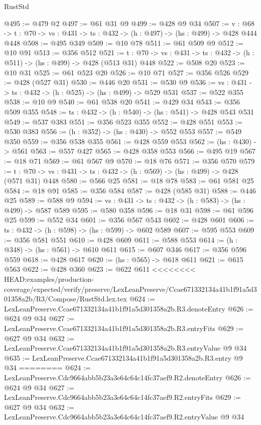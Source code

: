 \begin{lexlean}{RustStd}
\begin{coremodule}
{\begin{coremodule}
@495 := @479 @2
@497 := @61 @31 @9
@499 := @428 @9 @34
@507 := {v : @68} ->
  {t : @70} -> {vs : @431} -> {ts : @432} -> (h : @497) -> (hs : @499) -> @428 @444 @448
@508 := @495 @349
@509 := @10 @78
@511 := @61 @509 @9
@512 := @10 @91
@513 := @356 @512
@521 := {t : @70} -> {vs : @431} -> {ts : @432} -> (h : @511) -> (hs : @499) -> @428 (@513 @31) @448
@522 := @508 @20
@523 := @10 @31
@525 := @61 @523 @20
@526 := @10 @71
@527 := @356 @526
@529 := @428 (@527 @31)
@530 := @446 @20
@531 := @530 @9
@536 := {vs : @431} -> {ts : @432} -> (h : @525) -> (hs : @499) -> @529 @531
@537 := @522 @355
@538 := @10 @9
@540 := @61 @538 @20
@541 := @429 @34
@543 := @356 @509 @355
@548 := {ts : @432} -> (h : @540) -> (hs : @541) -> @428 @543 @531
@549 := @537 @383
@551 := @356 @523 @355
@552 := @428 @551
@553 := @530 @383
@556 := (h : @352) -> (hs : @430) -> @552 @553
@557 := @549 @350
@559 := @356 @538 @355
@561 := @428 @559 @553
@562 := (hs : @430) -> @561
@563 := @557 @427
@565 := @428 @358 @553
@566 := @495 @19
@567 := @18 @71
@569 := @61 @567 @9
@570 := @18 @76
@571 := @356 @570
@579 := {t : @70} -> {vs : @431} -> {ts : @432} -> (h : @569) -> (hs : @499) -> @428 (@571 @31) @448
@580 := @566 @25
@581 := @18 @78
@583 := @61 @581 @25
@584 := @18 @91
@585 := @356 @584
@587 := @428 (@585 @31)
@588 := @446 @25
@589 := @588 @9
@594 := {vs : @431} -> {ts : @432} -> (h : @583) -> (hs : @499) -> @587 @589
@595 := @580 @358
@596 := @18 @31
@598 := @61 @596 @25
@599 := @552 @34
@601 := @356 @567 @543
@602 := @428 @601
@606 := {ts : @432} -> (h : @598) -> (hs : @599) -> @602 @589
@607 := @595 @553
@609 := @356 @581 @551
@610 := @428 @609
@611 := @588 @553
@614 := (h : @348) -> (hs : @561) -> @610 @611
@615 := @607 @346
@617 := @356 @596 @559
@618 := @428 @617
@620 := (hs : @565) -> @618 @611
@621 := @615 @563
@622 := @428 @360
@623 := @622 @611
<<<<<<<< HEAD:examples/production-coverage/expected/verify/preserve/LexLeanPreserve/Ccae671332134a41b1f91a5d301358a2b/R3/Compose/RustStd.lex.tex
@624 := LexLeanPreserve.Ccae671332134a41b1f91a5d301358a2b.R3.denoteEntry
@626 := @624 @9 @34
@627 := LexLeanPreserve.Ccae671332134a41b1f91a5d301358a2b.R3.entryFits
@629 := @627 @9 @34
@632 := LexLeanPreserve.Ccae671332134a41b1f91a5d301358a2b.R3.entryValue @9 @34
@635 := LexLeanPreserve.Ccae671332134a41b1f91a5d301358a2b.R3.entry @9 @34
========
@624 := LexLeanPreserve.Cdc9664abb5b23a3e64c64c14fc37aef9.R2.denoteEntry
@626 := @624 @9 @34
@627 := LexLeanPreserve.Cdc9664abb5b23a3e64c64c14fc37aef9.R2.entryFits
@629 := @627 @9 @34
@632 := LexLeanPreserve.Cdc9664abb5b23a3e64c64c14fc37aef9.R2.entryValue @9 @34

\end{coremodule}}
\end{coremodule}
\end{lexlean}
